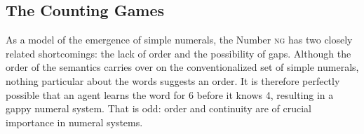 \documentclass{../src/bcthesispart}
\begin{document}
%



\subsection{The Counting Games}

As a model of the emergence of simple numerals, the Number \textsc{ng} has two closely related shortcomings: the lack of order and the possibility of gaps.
Although the order of the semantics carries over on the conventionalized set of simple numerals, nothing particular about the words suggests an order. %
It is therefore perfectly possible that an agent learns the word for 6 before it knows 4, resulting in a gappy numeral system.
That is odd: order and continuity are of crucial importance in numeral systems.
\end{document}
